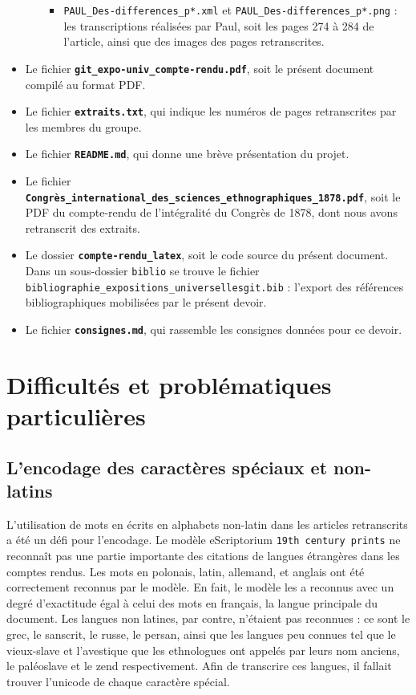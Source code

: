 \documentclass{article}
\begin{document}
\begin{itemize}
\begin{itemize}
\begin{itemize}
				\item 		\texttt{PAUL\_Des-differences\_p*.xml} et \texttt{PAUL\_Des-differences\_p*.png} : les transcriptions réalisées par Paul, soit les pages 274 à 284 de l'article, ainsi que des images des pages retranscrites.
			\end{itemize}
		\end{itemize}
		\item Le fichier \textbf{\texttt{git\_expo-univ\_compte-rendu.pdf}}, soit le présent document compilé au format PDF.
		\item Le fichier \textbf{\texttt{extraits.txt}}, qui indique les numéros de pages retranscrites par les membres du groupe.
		\item Le fichier \textbf{\texttt{README.md}}, qui donne une brève présentation du projet.
		\item Le fichier \textbf{\texttt{Congrès\_international\_des\_sciences\_ethnographiques\_1878.pdf}}, soit le PDF du compte-rendu de l'intégralité du Congrès de 1878, dont nous avons retranscrit des extraits.
		\item Le dossier \textbf{\texttt{compte-rendu\_latex}}, soit le code source du présent document. Dans un sous-dossier \texttt{biblio} se trouve le fichier \texttt{bibliographie\_expositions\_universellesgit.bib} : l'export des références bibliographiques mobilisées par le présent devoir.
		\item Le fichier \textbf{\texttt{consignes.md}}, qui rassemble les consignes données pour ce devoir.
	\end{itemize}
	
	
	\section{Difficultés et problématiques particulières}
	
	
	
	\subsection{L'encodage des caractères spéciaux et non-latins}
	
	L'utilisation de mots en écrits en alphabets non-latin dans les articles retranscrits a été un défi pour l’encodage. Le modèle eScriptorium \texttt{19th century prints} ne reconnaît pas une partie importante des citations de langues étrangères dans les comptes rendus. Les mots en polonais, latin, allemand, et anglais ont été correctement reconnus par le modèle. En fait, le modèle les a reconnus avec un degré d’exactitude égal à celui des mots en français, la langue principale du document. Les langues non latines, par contre, n’étaient pas reconnues : ce sont le grec, le sanscrit, le russe, le persan, ainsi que les langues peu connues tel que le vieux-slave et l’avestique que les ethnologues ont appelés par leurs nom anciens, le paléoslave et le zend respectivement. Afin de transcrire ces langues, il fallait trouver l’unicode de chaque caractère spécial.
	
\end{document}
